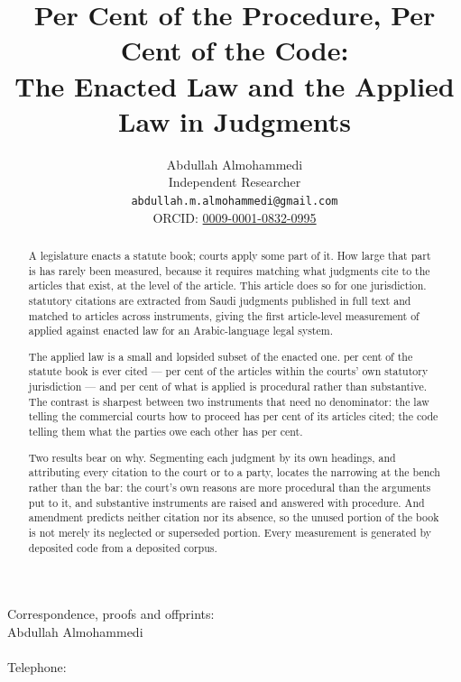 \documentclass[11pt]{article}
\title{\nCCLShareRound{} Per Cent of the Procedure,
\nCivilShareRound{} Per Cent of the Code:\\
The Enacted Law and the Applied Law in \nJudgments{} Judgments}
\author{}
\date{}
\author{Abdullah Almohammedi \\
    Independent Researcher \\
    \texttt{abdullah.m.almohammedi@gmail.com} \\
    ORCID: \href{https://orcid.org/0009-0001-0832-0995}{0009-0001-0832-0995}}
\date{}
\newif\ifanon
\begin{document}
\doublespacing
\maketitle

\ifanon\else
\begin{center}
\small
\begin{minipage}{0.8\textwidth}
\centering
\singlespacing
Correspondence, proofs and offprints:\\
Abdullah Almohammedi\\
\ContactAddress\\
Telephone: \ContactPhone\\
\texttt{\ContactEmail}
\end{minipage}
\end{center}
\fi

\thispagestyle{empty}
\newpage

\begin{abstract}
\noindent
A legislature enacts a statute book; courts apply some part of it. How large
that part is has rarely been measured, because it requires matching what
judgments cite to the articles that exist, at the level of the article. This
article does so for one jurisdiction. \nCitations{} statutory citations are
extracted from \nJudgments{} Saudi judgments published in full text and
matched to \nRegistryArticles{} articles across \nInstruments{} instruments,
giving the first article-level measurement of applied against enacted law for
an Arabic-language legal system.

The applied law is a small and lopsided subset of the enacted one.
\nArticlesCitedShare{} per cent of the statute book is ever cited ---
\nScopeNarrowShare{} per cent of the articles within the courts' own
statutory jurisdiction --- and \nProceduralShare{} per cent of what is
applied is procedural rather than substantive. The contrast is sharpest
between two instruments that need no denominator: the law telling the
commercial courts how to proceed has \nCCLShare{} per cent of its articles
cited; the code telling them what the parties owe each other has
\nCivilShare{} per cent.

Two results bear on why. Segmenting each judgment by its own headings, and
attributing every citation to the court or to a party, locates the narrowing
at the bench rather than the bar: the court's own reasons are more procedural
than the arguments put to it, and substantive instruments are raised and
answered with procedure. And amendment predicts neither
citation nor its absence, so the unused portion of the book is not merely its
neglected or superseded portion. Every measurement is generated by deposited
code from a deposited corpus.
\end{abstract}
\end{document}
